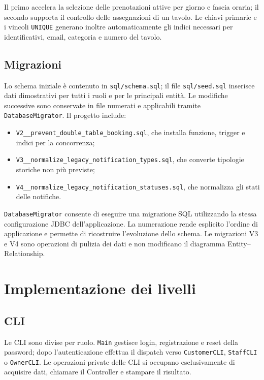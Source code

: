 \documentclass[12pt,a4paper]{article}
\newcommand{\code}[1]{\nolinkurl{#1}}
\begin{document}
Il primo accelera la selezione delle prenotazioni attive per giorno e fascia
oraria; il secondo supporta il controllo delle assegnazioni di un tavolo. Le
chiavi primarie e i vincoli \code{UNIQUE} generano inoltre automaticamente gli
indici necessari per identificativi, email, categoria e numero del tavolo.

\subsection{Migrazioni}

Lo schema iniziale è contenuto in \code{sql/schema.sql}; il file
\code{sql/seed.sql} inserisce dati dimostrativi per tutti i ruoli e per le
principali entità. Le modifiche successive sono conservate in file numerati e
applicabili tramite \code{DatabaseMigrator}. Il progetto include:

\begin{itemize}[leftmargin=*]
  \item \code{V2\_\_prevent\_double\_table\_booking.sql}, che installa
        funzione, trigger e indici per la concorrenza;
  \item \code{V3\_\_normalize\_legacy\_notification\_types.sql}, che converte
  tipologie storiche non più previste;
  \item \code{V4\_\_normalize\_legacy\_notification\_statuses.sql}, che
  normalizza gli stati delle notifiche.
\end{itemize}

\code{DatabaseMigrator} consente di eseguire una migrazione SQL utilizzando la
stessa configurazione JDBC dell'applicazione. La numerazione rende esplicito
l'ordine di applicazione e permette di ricostruire l'evoluzione dello schema.
Le migrazioni V3 e V4 sono operazioni di pulizia dei dati e non modificano il
diagramma Entity--Relationship.

\section{Implementazione dei livelli}

\subsection{CLI}

Le CLI sono divise per ruolo. \code{Main} gestisce login, registrazione e reset
della password; dopo l'autenticazione effettua il dispatch verso
\code{CustomerCLI}, \code{StaffCLI} o \code{OwnerCLI}. Le operazioni private
delle CLI si occupano esclusivamente di acquisire dati, chiamare il Controller e
stampare il risultato.
\end{document}
